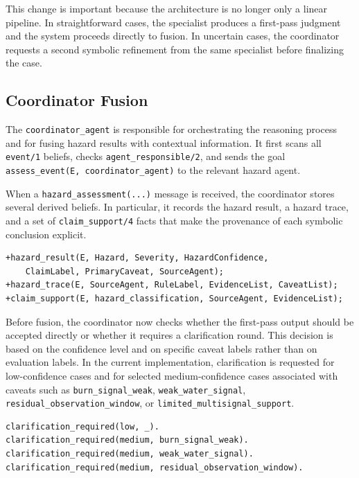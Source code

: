 \documentclass[11pt,a4paper]{article}
\begin{document}
This change is important because the architecture is no longer only a linear pipeline. In straightforward cases, the specialist produces a first-pass judgment and the system proceeds directly to fusion. In uncertain cases, the coordinator requests a second symbolic refinement from the same specialist before finalizing the case.

\subsection{Coordinator Fusion}

The \texttt{coordinator\_agent} is responsible for orchestrating the reasoning process and for fusing hazard results with contextual information. It first scans all \texttt{event/1} beliefs, checks \texttt{agent\_responsible/2}, and sends the goal \texttt{assess\_event(E, coordinator\_agent)} to the relevant hazard agent.

When a \texttt{hazard\_assessment(...)} message is received, the coordinator stores several derived beliefs. In particular, it records the hazard result, a hazard trace, and a set of \texttt{claim\_support/4} facts that make the provenance of each symbolic conclusion explicit.

\begin{lstlisting}
+hazard_result(E, Hazard, Severity, HazardConfidence,
    ClaimLabel, PrimaryCaveat, SourceAgent);
+hazard_trace(E, SourceAgent, RuleLabel, EvidenceList, CaveatList);
+claim_support(E, hazard_classification, SourceAgent, EvidenceList);
\end{lstlisting}

Before fusion, the coordinator now checks whether the first-pass output should be accepted directly or whether it requires a clarification round. This decision is based on the confidence level and on specific caveat labels rather than on evaluation labels. In the current implementation, clarification is requested for low-confidence cases and for selected medium-confidence cases associated with caveats such as \texttt{burn\_signal\_weak}, \texttt{weak\_water\_signal}, \texttt{residual\_observation\_window}, or \texttt{limited\_multisignal\_support}.

\begin{lstlisting}
clarification_required(low, _).
clarification_required(medium, burn_signal_weak).
clarification_required(medium, weak_water_signal).
clarification_required(medium, residual_observation_window).
\end{lstlisting}
\end{document}
